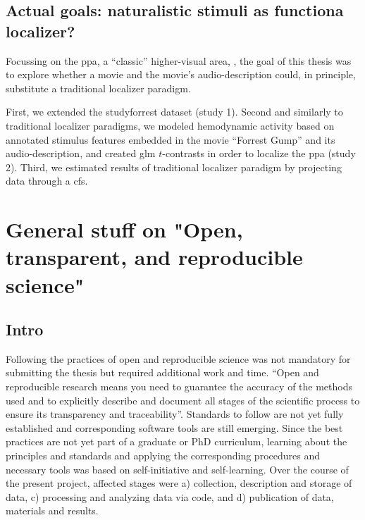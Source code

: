 \subsection{Actual goals: naturalistic stimuli as functiona localizer?}


Focussing on the \ac{ppa}, a ``classic'' higher-visual area,
\citep{epstein1998ppa}, the goal of this thesis was to explore whether a movie
and the movie's audio-description could, in principle, substitute a traditional
localizer paradigm.

%
First, we extended the studyforrest dataset (study 1).
%
Second and similarly to traditional localizer paradigms, we modeled hemodynamic
activity based on annotated stimulus features embedded in the movie ``Forrest
Gump'' and its audio-description, and created \ac{glm} $t$-contrasts in order to
localize the \ac{ppa} (study 2).
%
Third, we estimated results of traditional localizer paradigm by projecting data
through a \ac{cfs}.




\section{General stuff on "Open, transparent, and reproducible science"}



\subsection{Intro}
%
Following the practices of open and reproducible science was not mandatory for
submitting the thesis but required additional work and time.
%
``Open and reproducible research means you need to guarantee the accuracy of the
methods used and to explicitly describe and document all stages of the
scientific process to ensure its transparency and traceability''.
%
Standards to follow are not yet fully established and corresponding software
tools are still emerging.
%
Since the best practices are not yet part of a graduate or PhD curriculum,
learning about the principles and standards and applying the corresponding
procedures and necessary tools was based on self-initiative and self-learning.
%
Over the course of the present project, affected stages were
a) collection, description and storage of data,
c) processing and analyzing data via code, and
d) publication of data, materials and results.


